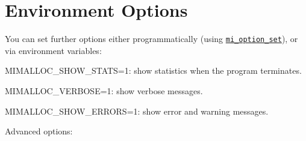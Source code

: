 \chapter{Environment Options}
\hypertarget{environment}{}\label{environment}
You can set further options either programmatically (using \href{https://microsoft.github.io/mimalloc/group__options.html}{\texttt{ {\ttfamily mi\+\_\+option\+\_\+set}}}), or via environment variables\+:


\begin{DoxyItemize}
\item {\ttfamily MIMALLOC\+\_\+\+SHOW\+\_\+\+STATS=1}\+: show statistics when the program terminates.
\item {\ttfamily MIMALLOC\+\_\+\+VERBOSE=1}\+: show verbose messages.
\item {\ttfamily MIMALLOC\+\_\+\+SHOW\+\_\+\+ERRORS=1}\+: show error and warning messages.
\end{DoxyItemize}

Advanced options\+:


